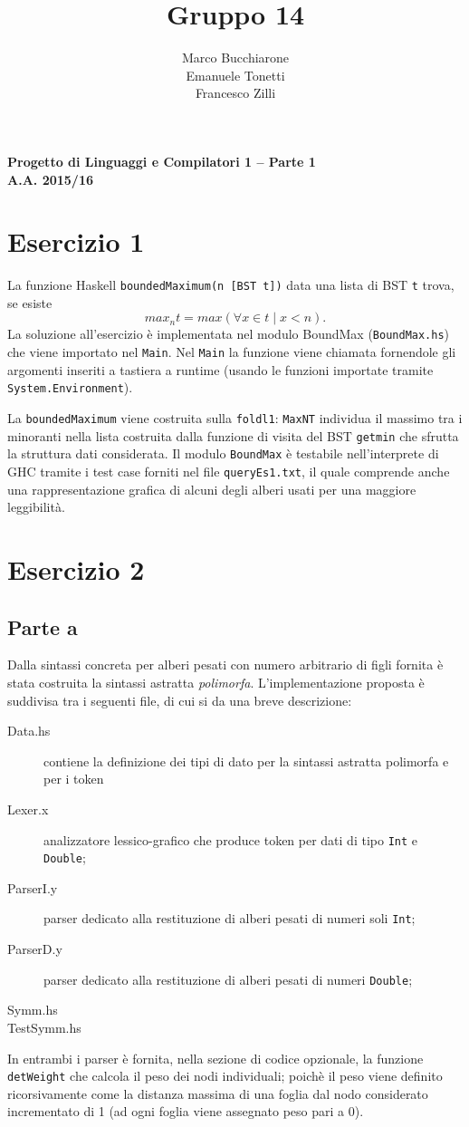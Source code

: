 \documentclass[a4paper, oneside, 11pt]{article}
\makeatletter
\renewcommand\and{\\}
\renewcommand\maketitle{%
\bigskip\bigskip\bigskip\bigskip%
\begin{center}\bfseries\large%
Progetto di Linguaggi e Compilatori 1 -- Parte 1 \\ A.A. 2015/16\\%
\end{center}%
\bigskip%
\begin{center}\bfseries\LARGE \@title  \end{center}%
\bigskip%
\begin{center}\bfseries\large \@author \end{center}%
\bigskip\bigskip}
\makeatother
\begin{document}
\title{Gruppo 14}
\author{Marco Bucchiarone \and Emanuele Tonetti \and Francesco Zilli}
\maketitle
%
\section*{Esercizio 1}
La funzione Haskell \texttt{boundedMaximum(n [BST t])} data una lista di BST \texttt{t} trova, se esiste  \[max_{n}{t}=max(\forall x \in t \mid  x<n ).\]
La soluzione all'esercizio \`e implementata nel modulo BoundMax (\texttt{BoundMax.hs}) che viene importato nel \texttt{Main}.
Nel \texttt{Main} la funzione viene chiamata fornendole gli argomenti inseriti a tastiera a runtime (usando le funzioni importate tramite \texttt{System.Environment}).
\par
La \texttt{boundedMaximum} viene costruita sulla \texttt{foldl1}: \texttt{MaxNT} individua il massimo tra i minoranti nella lista costruita dalla funzione di visita del BST \texttt{getmin} che sfrutta la struttura dati considerata.
Il modulo \texttt{BoundMax} \`e testabile nell'interprete di GHC tramite i test case forniti nel file \texttt{queryEs1.txt}, il quale comprende anche una rappresentazione grafica di alcuni degli alberi usati per una maggiore leggibilit\`a.
%
\section*{Esercizio 2}
\subsection*{Parte a}
Dalla sintassi concreta per alberi pesati con numero arbitrario di figli fornita \`e stata costruita la sintassi astratta \textit{polimorfa}.
L'implementazione proposta \`e suddivisa tra i seguenti file, di cui si da una breve descrizione:
\begin{description}
	\item[Data.hs] contiene la definizione dei tipi di dato per la sintassi astratta polimorfa  e per i token
	\item[Lexer.x] analizzatore lessico-grafico che produce token per dati di tipo \texttt{Int} e \texttt{Double};
	\item[ParserI.y] parser dedicato alla restituzione di alberi pesati di numeri soli \texttt{Int};
	\item[ParserD.y] parser dedicato alla restituzione di alberi pesati di numeri \texttt{Double};
	\item[Symm.hs] 
	\item[TestSymm.hs]
\end{description}	
\par
In entrambi i parser \`e fornita, nella sezione di codice opzionale, la funzione \texttt{detWeight} che calcola il peso dei nodi individuali; poich\`e il peso viene definito ricorsivamente come la distanza massima di una foglia dal nodo considerato incrementato di 1 (ad ogni foglia viene assegnato peso pari a 0). 
\end{document}
